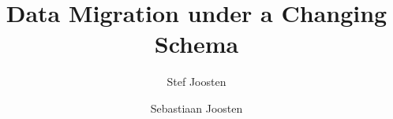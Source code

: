 \documentclass{elsarticle}
\begin{document}





\title{Data Migration under a Changing Schema}
\author[ou,ordina]{Stef Joosten}
\author[umn]{Sebastiaan Joosten}
\address[ou]{Open Universiteit Nederland, Heerlen, the Netherlands}
\address[ordina]{Ordina NV, Nieuwegein, the Netherlands}
\address[umn]{University of Minnesota, Minneapolis, USA}
\end{document}

